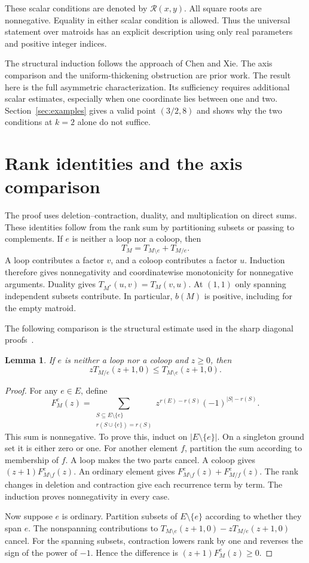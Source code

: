 \documentclass[11pt,a4paper]{article}
\newtheorem{lemma}[theorem]{Lemma}
\newcommand{\Reg}{\mathcal R}
\begin{document}
These scalar conditions are denoted by $\Reg(x,y)$. All square roots are
nonnegative. Equality in either scalar condition is allowed. Thus the
universal statement over matroids has an explicit description using only
real parameters and positive integer indices.

The structural induction follows the approach of Chen and Xie.
The axis comparison and the uniform-thickening obstruction are prior work.
The result here is the full asymmetric characterization. Its sufficiency
requires additional scalar estimates, especially when one coordinate lies
between one and two. Section~\ref{sec:examples} gives a valid point
$(3/2,8)$ and shows why the two conditions at $k=2$ alone do not suffice.

\section{Rank identities and the axis comparison}

The proof uses deletion--contraction, duality, and multiplication on direct sums.
These identities follow from the rank sum by partitioning subsets or
passing to complements. If $e$ is neither a loop nor a coloop, then
\[
T_M=T_{M\setminus e}+T_{M/e}.
\]
A loop contributes a factor $v$, and a coloop contributes a factor $u$.
Induction therefore gives nonnegativity and coordinatewise monotonicity
for nonnegative arguments. Duality gives $T_{M^*}(u,v)=T_M(v,u)$.
At $(1,1)$ only spanning independent subsets contribute. In particular,
$b(M)$ is positive, including for the empty matroid.

The following comparison is the structural estimate used in the sharp
diagonal proofs~\cite{Liu,CX}.
\begin{lemma}\label{lem:axis}
If $e$ is neither a loop nor a coloop and $z\geq0$, then
\[
zT_{M/e}(z+1,0)\leq T_{M\setminus e}(z+1,0).
\]
\end{lemma}
\begin{proof}
For any $e\in E$, define
\[
F_M^e(z)=\sum_{\substack{S\subseteq E\setminus\{e\}\\r(S\cup\{e\})=r(S)}}
z^{r(E)-r(S)}(-1)^{|S|-r(S)}.
\]
This sum is nonnegative. To prove this, induct on $|E\setminus\{e\}|$.
On a singleton ground set it is either zero or one. For another element
$f$, partition the sum according to membership of $f$. A loop makes the
two parts cancel. A coloop gives $(z+1)F_{M\setminus f}^e(z)$.
An ordinary element gives $F_{M\setminus f}^e(z)+F_{M/f}^e(z)$.
The rank changes in deletion and contraction give each recurrence term
by term. The induction proves nonnegativity in every case.

Now suppose $e$ is ordinary. Partition subsets of $E\setminus\{e\}$
according to whether they span $e$. The nonspanning contributions to
$T_{M\setminus e}(z+1,0)-zT_{M/e}(z+1,0)$ cancel. For the spanning
subsets, contraction lowers rank by one and reverses the sign of the
power of $-1$. Hence the difference is $(z+1)F_M^e(z)\geq0$.
\end{proof}
\end{document}
